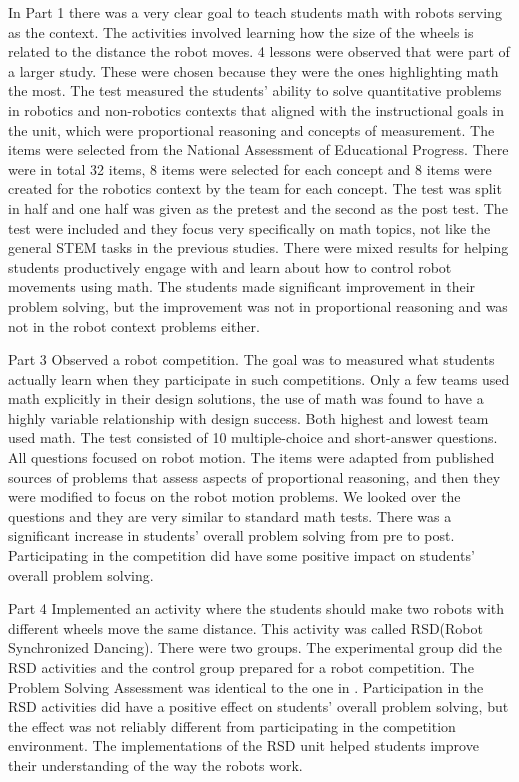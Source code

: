 \bigskip\noindent
In Part 1 there was a very clear goal to teach students math with robots serving as the context. The activities involved learning how the size of the wheels is related to the distance the robot moves. 4 lessons were observed that were part of a larger study. These were chosen because they were the ones highlighting math the most. The test measured the students’ ability to solve quantitative problems in robotics and non-robotics contexts that aligned with the instructional goals in the unit, which were proportional reasoning and concepts of measurement. The items were selected from the National Assessment of Educational Progress. There were in total 32 items, 8 items were selected for each concept and 8 items were created for the robotics context by the team for each concept. The test was split in half and one half was given as the pretest and the second as the post test. The test were included and they focus very specifically on math topics, not like the general STEM tasks in the previous studies. There were mixed results for helping students productively engage with and learn about how to control robot movements using math. The students made significant improvement in their problem solving, but the improvement was not in proportional reasoning and was not in the robot context problems either. 

\bigskip\noindent
Part 3 Observed a robot competition. The goal was to measured what students actually learn when they participate in such competitions. Only a few teams used math explicitly in their design solutions, the use of math was found to have a highly variable relationship with design success. Both highest and lowest team used math. The test consisted of 10 multiple-choice and short-answer questions. All questions focused on robot motion. The items were adapted from published sources of problems that assess aspects of proportional reasoning, and then they were modified to focus on the robot motion problems. We looked over the questions and they are very similar to standard math tests. There was a significant increase in students’ overall problem solving from pre to post. Participating in the competition did have some positive impact on students’ overall problem solving.

\bigskip\noindent
Part 4 Implemented an activity where the students should make two robots with different wheels move the same distance. This activity was called RSD(Robot Synchronized Dancing). There were two groups. The experimental group did the RSD activities and the control group prepared for a robot competition. The Problem Solving Assessment was identical to the one in \cite{silk2011resources}. Participation in the RSD activities did have a positive effect on students’ overall problem solving, but the effect was not reliably different from participating in the competition environment. The implementations of the RSD unit helped students improve their understanding of the way the robots work. 

